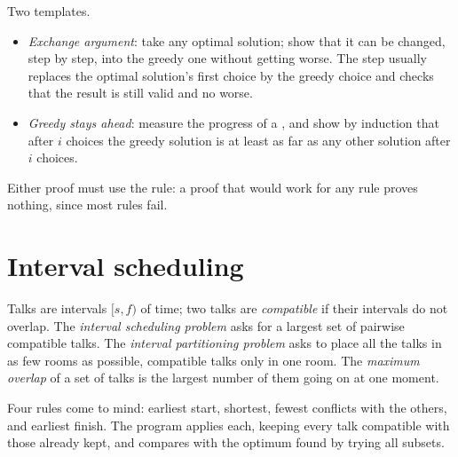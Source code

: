 \begin{method}\label{met:b1:greedy-proofs:exchange}
Two templates.
\begin{itemize}
\item \emph{Exchange argument}: take any optimal solution; show that it can be changed, step by
step, into the greedy one without getting worse. The step usually replaces the optimal solution's first choice by the
greedy choice and checks that the result is still valid and no worse.
\item \emph{Greedy stays ahead}: measure the progress of a , and show by induction that after $i$
choices the greedy solution is at least as far as any other solution after $i$ choices.
\end{itemize}
Either proof must use the rule: a proof that would work for any rule proves nothing, since most rules fail.
\end{method}

\section{Interval scheduling}\label{sec:b1:greedy-proofs:intervals}

\begin{definition}\label{def:b1:greedy-proofs:intervals}
Talks are intervals $[s, f)$ of time; two talks are \emph{compatible} if their intervals do not overlap. The
\emph{interval scheduling problem} asks for a largest set of pairwise compatible
talks. The \emph{interval partitioning problem} asks to place all the talks in as few rooms
as possible, compatible talks only in one room. The \emph{maximum overlap} of a set of talks is
the largest number of them going on at one moment.
\end{definition}

Four rules come to mind: earliest start, shortest, fewest conflicts with the others, and earliest finish. The program
applies each, keeping every talk compatible with those already kept, and compares with the optimum found by trying all
subsets.

\label{lst:b1:greedy-proofs:intervals}

\label{out:b1:greedy-proofs:intervals}


